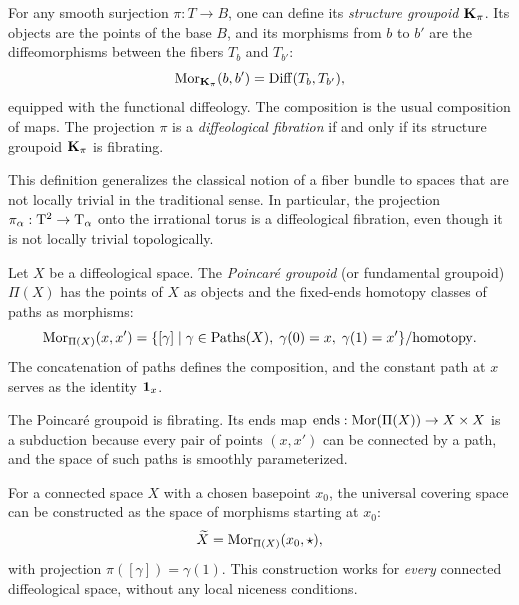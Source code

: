 \documentclass[10pt,reqno,letterpaper,twoside]{amsbook}
\begin{document}
  \begin{article}
    For any smooth surjection $\pi: T \to B$,
    one can define its \emph{structure groupoid} ${\mathbf K}_\pi$.
    Its objects are the points of the base $B$,
    and its morphisms from $b$ to $b'$ are the diffeomorphisms between the fibers $T_b$ and $T_{b'}$:
    \[
      {\operatorname{Mor}}_{{\mathbf K}_\pi}(b,b') = \operatorname{Diff}(T_b, T_{b'}),
      \]
    equipped with the functional diffeology.
    The composition is the usual composition of maps.
    The projection $\pi$ is a \emph{diffeological fibration} if and only if its structure groupoid ${\mathbf K}_\pi$ is fibrating.
    
    This definition generalizes the classical notion of a fiber bundle to spaces that are not locally trivial in the traditional sense.
    In particular,
    the projection $\pi_\alpha: \mathrm{T}^2 \to \mathrm{T}_\alpha$ onto the irrational torus
    is a diffeological fibration,
    even though it is not locally trivial topologically.
  \end{article}
  
  \begin{article}
    Let $X$ be a diffeological space.
    The \emph{Poincaré groupoid} (or fundamental groupoid) $\Pi(X)$ has the points of $X$ as objects
    and the fixed-ends homotopy classes of paths as morphisms:
    \[
      {\operatorname{Mor}}_{\Pi(X)}(x,x') = \{ [\gamma] \mid \gamma \in \operatorname{Paths}(X), \; \gamma(0)=x,\; \gamma(1)=x' \}/\text{homotopy}.
      \]
    The concatenation of paths defines the composition,
    and the constant path at $x$ serves as the identity $\boldsymbol{1}_x$.
    
    The Poincaré groupoid is fibrating.
    Its ends map $\operatorname{ends}: {\operatorname{Mor}}(\Pi(X)) \to X \times X$ is a subduction because every pair of points $(x,x')$
    can be connected by a path,
    and the space of such paths is smoothly parameterized.
    
    For a connected space $X$ with a chosen basepoint $x_0$,
    the universal covering space can be constructed as the space of morphisms starting at $x_0$:
    \[
      \widetilde{X} = {\operatorname{Mor}}_{\Pi(X)}(x_0, \star),
      \]
    with projection $\pi([\gamma]) = \gamma(1)$.
    This construction works for \emph{every} connected diffeological space,
    without any local niceness conditions.
  \end{article}
  
\end{document}

